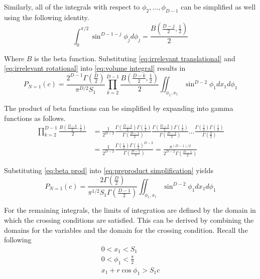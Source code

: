 \documentclass{article}
\begin{document}
Similarly, all of the integrals with respect to $\phi_2, \hdots, \phi_{D-1}$ can be simplified as well using the following identity.
\begin{equation}
	\int_0^{\pi/2}\sin^{D-1-j}\phi_jd\phi_j = \frac{B(\frac{D-j}{2}, \frac{1}{2})}{2}\label{eq:irrelevant rotational}
\end{equation}

Where $B$ is the beta function. Substituting \ref{eq:irrelevant translational} and \ref{eq:irrelevant rotational} into 
\ref{eq:volume integral} results in
\begin{equation} \label{eq:preproduct simplification}
	P_{N=1}(c) = \frac{2^{D-1}\Gamma(\frac{D}{2})}{\pi^{D/2}S_1} \prod_{k=2}^{D-1}\frac{B(\frac{D-k}{2}, \frac{1}{2})}{2} \iint_{\phi_1,x_1}\sin^{D-2}\phi_1 dx_1 d\phi_1
\end{equation}

The product of beta functions can be simplified by expanding into gamma functions as follows.
\begin{align}
	\prod_{k=2}^{D-1}\frac{B(\frac{D-k}{2}, \frac{1}{2})}{2} &= \frac{1}{2^{D-2}} \frac{\Gamma(\frac{D-2}{2})\Gamma(\frac{1}{2})}{\Gamma(\frac{D-1}{2})} \frac{\Gamma(\frac{D-3}{2})\Gamma(\frac{1}{2})}{\Gamma(\frac{D-2}{2})} \hdots \frac{\Gamma(\frac{1}{2})\Gamma(\frac{1}{2})}{\Gamma(\frac{2}{2})} \\
	&= \frac{1}{2^{D-2}} \frac{\Gamma(\frac{1}{2})\Gamma(\frac{1}{2})^{D-2}}{\Gamma(\frac{D-1}{2})} = \frac{\pi^{(D-1)/2}}{2^{D-2}\Gamma(\frac{D-1}{2})} \label{eq:beta prod}
\end{align}

Substituting \ref{eq:beta prod} into \ref{eq:preproduct simplification} yields
\begin{equation}
	P_{N=1}(c) = \frac{2\Gamma(\frac{D}{2})}{\pi^{1/2}S_1\Gamma(\frac{D-1}{2})} \iint_{\phi_1,x_1}\sin^{D-2}\phi_1 dx_1 d\phi_1 \label{eq:n=1 int}
\end{equation}

For the remaining integrals, the limits of integration are defined by the domain in which the crossing conditions are satisfied. This
can be derived by combining the domains for the variables and the domain for the crossing condition. Recall the following
\begin{gather*}
	0 < x_1 < S_1 \\
	0 < \phi_1 < \frac{\pi}{2} \\
	x_1 + r\cos\phi_1 > S_1c
\end{gather*}
\end{document}
